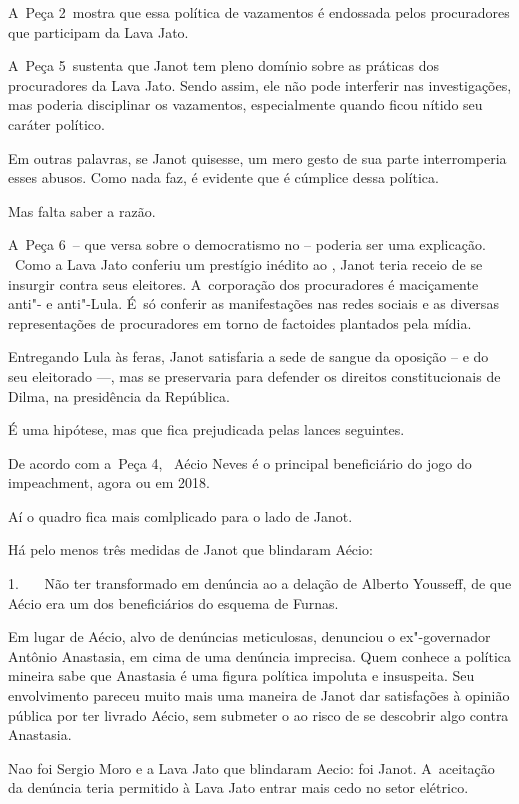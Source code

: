 A~Peça 2~mostra que essa política de vazamentos é endossada pelos
procuradores que participam da Lava Jato.

A~Peça 5~sustenta que Janot tem pleno domínio sobre as práticas dos
procuradores da Lava Jato. Sendo assim, ele não pode interferir nas
investigações, mas poderia disciplinar os vazamentos, especialmente
quando ficou nítido seu caráter político.

Em outras palavras, se Janot quisesse, um mero gesto de sua parte
interromperia esses abusos. Como nada faz, é evidente que é cúmplice
dessa política.

Mas falta saber a razão.

A~Peça 6~-- que versa sobre o democratismo no  -- poderia ser uma
explicação. ~Como a Lava Jato conferiu um prestígio inédito ao ,
Janot teria receio de se insurgir contra seus eleitores. A~corporação
dos procuradores é maciçamente anti"- e anti"-Lula. É~só conferir as
manifestações nas redes sociais e as diversas representações de
procuradores em torno de factoides plantados pela mídia.

Entregando Lula às feras, Janot satisfaria a sede de sangue da oposição
-- e do seu eleitorado \mbox{---,} mas se preservaria para defender os direitos
constitucionais de Dilma, na presidência da República.

É uma hipótese, mas que fica prejudicada pelas lances seguintes.

De acordo com a~Peça 4, ~Aécio Neves é o principal beneficiário do jogo
do impeachment, agora ou em 2018.

Aí o quadro fica mais comlplicado para o lado de Janot.

Há pelo menos três medidas de Janot que blindaram Aécio:

1.~~~ Não ter transformado em denúncia ao  a delação de Alberto
Yousseff, de que Aécio era um dos beneficiários do esquema de Furnas.

Em lugar de Aécio, alvo de denúncias meticulosas, denunciou o
ex"-governador Antônio Anastasia, em cima de uma denúncia imprecisa. Quem
conhece a política mineira sabe que Anastasia é uma figura política
impoluta e insuspeita. Seu envolvimento pareceu muito mais uma maneira
de Janot dar satisfações à opinião pública por ter livrado Aécio, sem
submeter o  ao risco de se descobrir algo contra Anastasia.

Nao foi Sergio Moro e a Lava Jato que blindaram Aecio: foi Janot. A~aceitação da denúncia teria permitido à Lava Jato entrar mais cedo no
setor elétrico.

